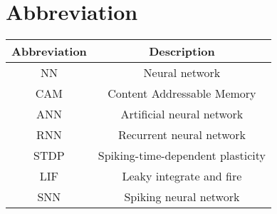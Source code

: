 \chapter*{\centering Abbreviation}%
\begin{center}
\end{center}
\begin{center}
    \begin{tabular}{ c c   }
        \hline
        Abbreviation & Description                       \\
        \hline
        NN           & Neural network                    \\
        CAM          & Content Addressable Memory        \\
        ANN          & Artificial neural network         \\
        RNN          & Recurrent neural network          \\
        STDP         & Spiking-time-dependent plasticity \\
        LIF          & Leaky integrate and fire          \\
        SNN          & Spiking neural network            \\

        \hline
    \end{tabular}
\end{center}